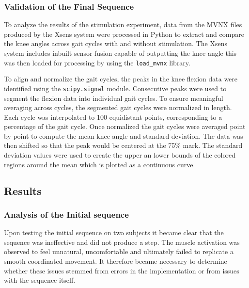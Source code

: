 \subsubsection{Validation of the Final Sequence}
To analyze the results of the stimulation experiment, data from the MVNX files produced by the Xsens system were processed in Python to extract and compare the knee angles across gait cycles with and without stimulation. The Xsens system includes inbuilt sensor fusion capable of outputting the knee angle this was then loaded for processing by using the \texttt{load\_mvnx} library. 

To align and normalize the gait cycles, the peaks in the knee flexion data were identified using the \texttt{scipy.signal} module. Consecutive peaks were used to segment the flexion data into individual gait cycles. To ensure meaningful averaging across cycles, the segmented gait cycles were normalized in length. Each cycle was interpolated to 100 equidistant points, corresponding to a percentage of the gait cycle. Once normalized the gait cycles were averaged point by point to compute the mean knee angle and standard deviation. The data was then shifted so that the peak would be centered at the 75\% mark. The standard deviation values were used to create the upper an lower bounds of the colored regions around the mean which is plotted as a continuous curve. 

\subsection{Results}

\subsubsection{Analysis of the Initial sequence}
Upon testing the initial sequence on two  subjects it became clear that the sequence was ineffective and did not produce a step. The muscle activation was observed to feel unnatural, uncomfortable and ultimately failed to replicate a smooth coordinated movement. It therefore became necessary to determine whether these issues stemmed from errors in the implementation or from issues with the sequence itself.

